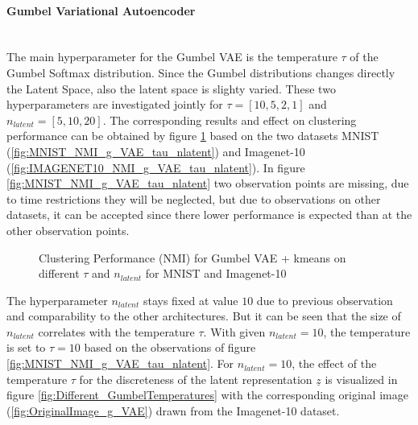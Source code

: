 \documentclass[12pt,DIV14,BCOR12mm,a4paper,footexclude,headinclude,halfparskip-,twoside,openright,openany,cleardoubleempty,idxtotoc,bibtotoc]{scrreprt} %
\numberwithin{equation}{chapter}
\begin{document}
	\paragraph{Gumbel Variational Autoencoder}\hfill \\
	The main hyperparameter for the Gumbel VAE is the temperature $\tau$ of the Gumbel Softmax distribution. Since the Gumbel distributions changes directly the Latent Space, also the latent space is slighty varied. These two hyperparameters are investigated jointly for $\tau = [10, 5, 2, 1]$ and $n_{latent} = [5, 10, 20]$. The corresponding results and effect on clustering performance can be obtained by figure \ref{fig:ClusterPerformance_g_VAE_Hyperparameters} based on the two datasets MNIST (\ref{fig:MNIST_NMI_g_VAE_tau_nlatent}) and Imagenet-10 (\ref{fig:IMAGENET10_NMI_g_VAE_tau_nlatent}). In figure \ref{fig:MNIST_NMI_g_VAE_tau_nlatent} two observation points are missing, due to time restrictions they will be neglected, but due to observations on other datasets, it can be accepted since there lower performance is expected than at the other observation points.
	 \begin{figure}[htb!]
		\centering
		\qquad
		\caption{Clustering Performance (NMI) for Gumbel VAE + kmeans on different $\tau$ and $n_{latent}$ for MNIST and Imagenet-10}
		\label{fig:ClusterPerformance_g_VAE_Hyperparameters}
	\end{figure}
	The hyperparameter $n_{latent}$ stays fixed at value $10$ due to previous observation and comparability to the other architectures. But it can be seen that the size of $n_{latent}$ correlates with the temperature $\tau$. With given $n_{latent}=10$, the temperature is set to $\tau=10$ based on the observations of figure \ref{fig:MNIST_NMI_g_VAE_tau_nlatent}. For $n_{latent}=10$, the effect of the temperature $\tau$ for the discreteness of the latent representation $\underline{z}$ is visualized in figure \ref{fig:Different_GumbelTemperatures} with the corresponding original image (\ref{fig:OriginalImage_g_VAE}) drawn from the Imagenet-10 dataset.
\end{document}
